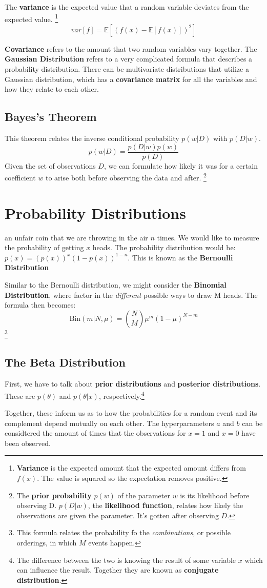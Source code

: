 \documentclass{tufte-handout}
\begin{document}
		The \textbf{variance} is the expected value that a random variable deviates from the 
		expected value. \footnote{\textbf{Variance} is the expected amount that the 
		expected amount differs from $f(x)$. 
		The value is squared so the expectation removes positive.}
		\[ var[f] = \mathbb{E}[(f(x) - \mathbb{E}[f(x)])^{2}]\]

		\textbf{Covariance} refers to the amount that two random variables vary together. The 
		\textbf{Gaussian Distribution} refers to a very complicated formula that describes a
		probability distribution.  There can be multivariate distributions that utilize a 
		Gaussian distribution, which has a \textbf{covariance matrix} for all the variables and
		how they relate to each other. 

	\subsection{Bayes's Theorem}
		This theorem relates the inverse conditional probability $p(w|D)$ with $p(D|w)$. 
		\[ p(w|D) = \frac{p(D|w)p(w)}{p(D)}\]
		Given the set of observations $D$, we can formulate how likely it was for a certain 
		coefficient $w$ to arise both before observing the data and after. \footnote{The 
		\textbf{prior probability} $p(w)$ of the parameter $w$ is its likelihood 
		before observing D. $p(D|w)$, the \textbf{likelihood function}, relates how likely
		the observations are given the parameter. It's gotten after observing $D$.} 
\section{Probability Distributions}
	 an unfair coin that we are throwing in the air $n$ times. We would like
	to measure the probability of getting $x$ heads. The probability distribution would be:
	$p(x)=(p(x))^{x}(1-p(x))^{1-n}$. This is known as the \textbf{Bernoulli Distribution}

	Similar to the Bernoulli distribution, we might consider the \textbf{Binomial Distribution},
	where factor in the \textit{different} possible ways to draw M heads. The formula then becomes:
	\[ \textrm{Bin}(m|N,\mu) = {N\choose M}\mu^{m}(1-\mu)^{N-m}\]\footnote{This formula relates the 
	probability fo the \textit{combinations}, or possible orderings, in which $M$ events happen.}

	\subsection{The Beta Distribution}
	First, we have to talk about \textbf{prior distributions} and \textbf{posterior distributions}.
	These are $p(\theta)$ and $p(\theta|x)$, respectively.\footnote{The difference between the two is
	knowing the result of some variable $x$ which can influence the result. Together they are known as
	\textbf{conjugate distribution}.} 

	Together, these inform us as to how the probabilities for a random event and its complement 
	depend mutually on each other. The hyperparameters $a$ and $b$ can be considtered the amount
	of times that the observations for $x=1$ and $x=0$ have been observed.
\end{document}
